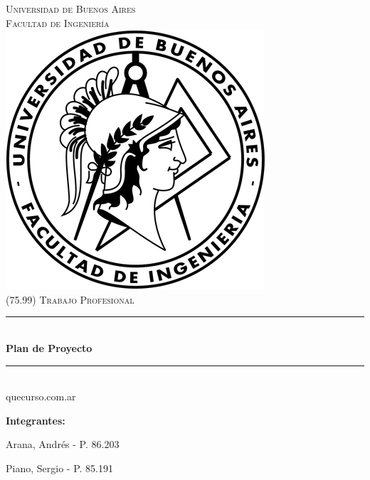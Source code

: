 \documentclass[a4paper,11pt]{article}
\begin{document}

\thispagestyle{empty}

\begin{titlepage}

\newcommand{\HRule}{\rule{\linewidth}{0.5mm}}
\newenvironment{bottompar}{\par\vspace*{\fill}}{\clearpage}

\center

\textsc{\LARGE Universidad de Buenos Aires}\\[0.5cm]
\textsc{\Large Facultad de Ingeniería}\\[1.5cm]

\includegraphics[scale=0.5]{src/common/logo.png}\\[1cm]


\textsc{\large (75.99) Trabajo Profesional}\\[0.25cm]
\HRule \\[0.4cm]
{\huge \bfseries Plan de Proyecto}
\HRule \\[0.4cm]

{\large quecurso.com.ar}

\begin{bottompar}
\flushleft
{\bfseries Integrantes:}

Arana, Andrés          - P. 86.203

Piano, Sergio          - P. 85.191
\end{bottompar}

\end{titlepage}
\end{document}
